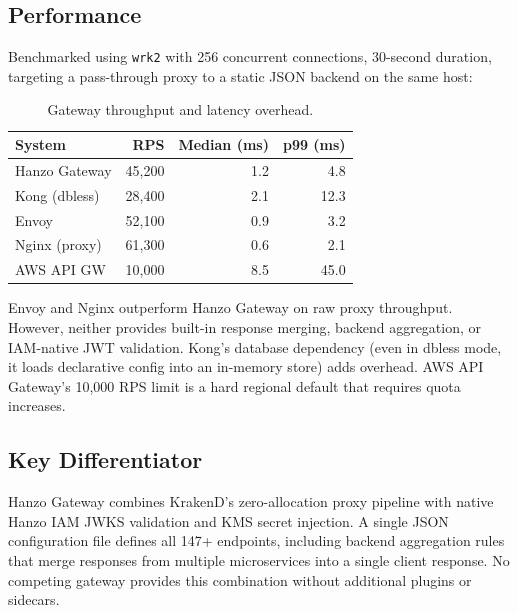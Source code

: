 \subsection{Performance}

Benchmarked using \texttt{wrk2} with 256 concurrent connections, 30-second duration, targeting a pass-through proxy to a static JSON backend on the same host:

\begin{table}[H]
\centering
\caption{Gateway throughput and latency overhead.}
\footnotesize
\begin{tabular}{@{}lrrr@{}}
\toprule
System & RPS & Median (ms) & p99 (ms) \\
\midrule
Hanzo Gateway & 45,200 & 1.2 & 4.8 \\
Kong (dbless) & 28,400 & 2.1 & 12.3 \\
Envoy & 52,100 & 0.9 & 3.2 \\
Nginx (proxy) & 61,300 & 0.6 & 2.1 \\
AWS API GW & 10,000 & 8.5 & 45.0 \\
\bottomrule
\end{tabular}
\end{table}

Envoy and Nginx outperform Hanzo Gateway on raw proxy throughput. However, neither provides built-in response merging, backend aggregation, or IAM-native JWT validation. Kong's database dependency (even in dbless mode, it loads declarative config into an in-memory store) adds overhead. AWS API Gateway's 10,000 RPS limit is a hard regional default that requires quota increases.

\subsection{Key Differentiator}

Hanzo Gateway combines KrakenD's zero-allocation proxy pipeline with native Hanzo IAM JWKS validation and KMS secret injection. A single JSON configuration file defines all 147+ endpoints, including backend aggregation rules that merge responses from multiple microservices into a single client response. No competing gateway provides this combination without additional plugins or sidecars.


